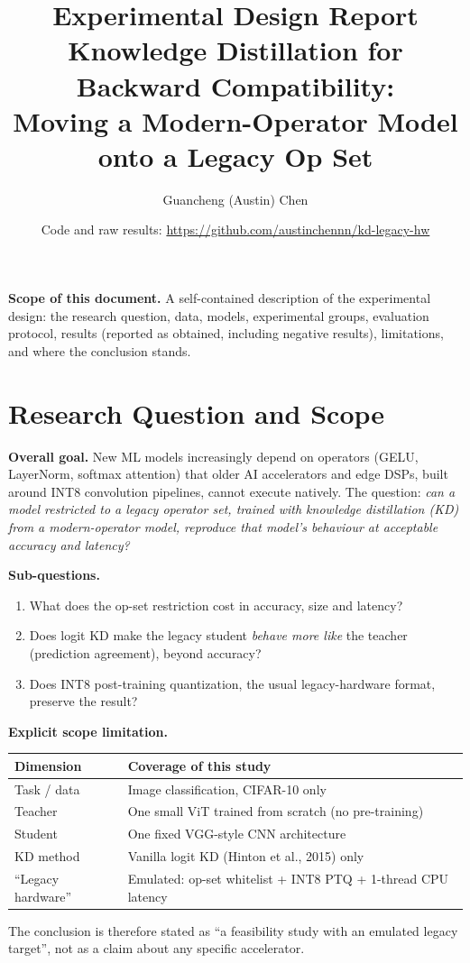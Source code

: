 \documentclass[11pt]{article}
\title{\textbf{Experimental Design Report}\\[4pt]\large Knowledge Distillation for Backward Compatibility:\\
Moving a Modern-Operator Model onto a Legacy Op Set}
\author{Guancheng (Austin) Chen}
\date{Code and raw results: \url{https://github.com/austinchennn/kd-legacy-hw}}
\begin{document}
\sloppy
\maketitle

\noindent\textbf{Scope of this document.} A self-contained description of the experimental design:
the research question, data, models, experimental groups, evaluation protocol, results
(reported as obtained, including negative results), limitations, and where the conclusion stands.

\tableofcontents

\section{Research Question and Scope}
\textbf{Overall goal.} New ML models increasingly depend on operators (GELU, LayerNorm, softmax attention)
that older AI accelerators and edge DSPs, built around INT8 convolution pipelines, cannot execute natively.
The question: \emph{can a model restricted to a legacy operator set, trained with knowledge distillation (KD)
from a modern-operator model, reproduce that model's behaviour at acceptable accuracy and latency?}

\medskip\noindent\textbf{Sub-questions.}
\begin{enumerate}[label=Q\arabic*.]
  \item What does the op-set restriction cost in accuracy, size and latency?
  \item Does logit KD make the legacy student \emph{behave more like} the teacher (prediction agreement), beyond accuracy?
  \item Does INT8 post-training quantization, the usual legacy-hardware format, preserve the result?
\end{enumerate}

\noindent\textbf{Explicit scope limitation.}
\begin{center}\begin{tabular}{ll}\toprule
Dimension & Coverage of this study\\\midrule
Task / data & Image classification, CIFAR-10 only\\
Teacher & One small ViT trained from scratch (no pre-training)\\
Student & One fixed VGG-style CNN architecture\\
KD method & Vanilla logit KD (Hinton et al., 2015) only\\
``Legacy hardware'' & Emulated: op-set whitelist + INT8 PTQ + 1-thread CPU latency\\\bottomrule
\end{tabular}\end{center}
The conclusion is therefore stated as ``a feasibility study with an emulated legacy target'', not as a
claim about any specific accelerator.
\end{document}
